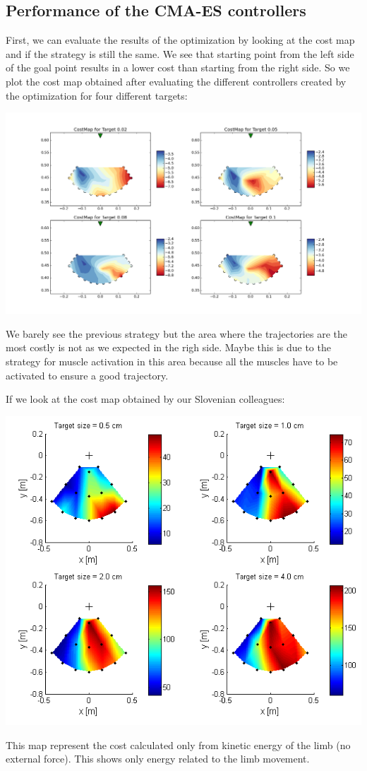 \documentclass[pdftex,a4paper,11pt]{report}
\begin{document}
\subsection{Performance of the CMA-ES controllers}
First, we can evaluate the results of the optimization by looking at the cost map and if the strategy is still the same. We see that starting point from the left side of the goal point results in a lower cost than starting from the right side.
So we plot the cost map obtained after evaluating the different controllers created by the optimization for four different targets:
\begin{center}
\includegraphics[scale=0.3]{figures/costMapAll.png}
\end{center}
We barely see the previous strategy but the area where the trajectories are the most costly is not as we expected in the righ side.
Maybe this is due to the strategy for muscle activation in this area because all the muscles have to be activated to ensure a good trajectory.

If we look at the cost map obtained by our Slovenian colleagues:
\begin{center}
\includegraphics[scale=0.7]{figures/cost_dyn_no_ext_force.png}
\end{center}
This map represent the cost calculated only from kinetic energy of the limb (no external force). This shows only energy related to the limb movement.
\end{document}
